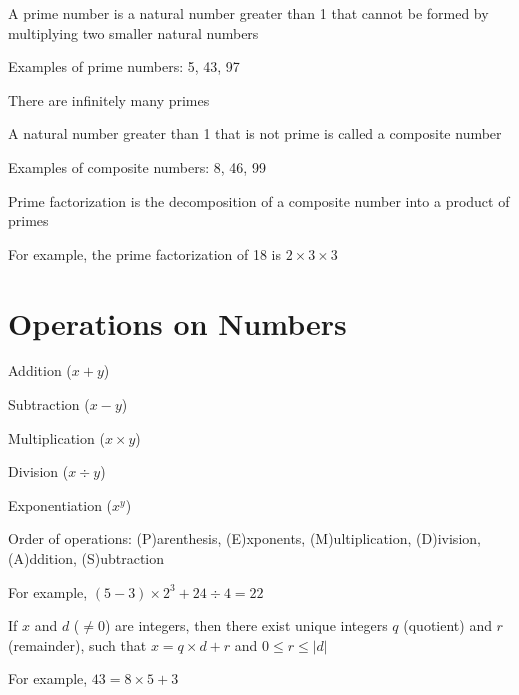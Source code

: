 \documentclass[8pt,a4paper,compress]{beamer}
\begin{document}
\begin{frame}[fragile]
\pause

A prime number is a natural number greater than 1 that cannot be formed by multiplying two smaller natural numbers

\pause\bigskip

Examples of prime numbers: 5, 43, 97

\pause\bigskip

There are infinitely many primes

\pause\bigskip

A natural number greater than 1 that is not prime is called a composite number

\pause\bigskip

Examples of composite numbers: 8, 46, 99

\pause\bigskip

Prime factorization is the decomposition of a composite number into a product of primes

\pause\bigskip

For example, the prime factorization of 18 is $2 \times 3 \times 3$
\end{frame}

\section{Operations on Numbers}
\begin{frame}[fragile]
\pause

Addition ($x + y$)

\pause\bigskip

Subtraction ($x - y$)

\pause\bigskip

Multiplication ($x \times y$)

\pause\bigskip

Division ($x \div y$)

\pause\bigskip

Exponentiation ($x^y$)

\pause\bigskip

Order of operations: (P)arenthesis, (E)xponents, (M)ultiplication, (D)ivision, (A)ddition, (S)ubtraction

\pause\bigskip

For example, $(5 - 3) \times 2^3 + 24 \div 4 = 22$

\pause\bigskip

If $x$ and $d$ ($\neq 0$) are integers, then there exist unique integers $q$ (quotient) and $r$ (remainder), such that $x = q \times d + r$ and $0 \leq r \leq |d|$

\pause\bigskip

For example, $43 = 8 \times 5 + 3$
\end{frame}
\end{document}
